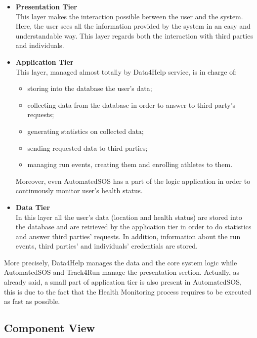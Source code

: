 \begin{itemize}
	\item \textbf{Presentation Tier} \\This layer makes the interaction possible between the user and the system. Here, the user sees all the information provided by the system in an easy and understandable way. This layer regards both the interaction with third parties and individuals. 
	\item \textbf{Application Tier} \\This layer, managed almost totally by Data4Help service, is in charge of:
	\begin{itemize}
		\item storing into the database the user's data;
		\item collecting data from the database in order to answer to third party's requests;
		\item generating statistics on collected data;
		\item sending requested data to third parties;
		\item managing run events, creating them and enrolling athletes to them.
	\end{itemize}
	Moreover, even AutomatedSOS has a part of the logic application in order to continuously monitor user's health status.
	\item \textbf{Data Tier} \\In this layer all the user's data (location and health status) are stored into the database and are retrieved by the application tier in order to do statistics and answer third parties' requests. In addition, information about the run events, third parties' and individuals' credentials are stored.
\end{itemize}
\bigbreak
\noindent
More precisely, Data4Help manages the data and the core system logic while AutomatedSOS and Track4Run manage the presentation section. Actually, as already said, a small part of application tier is also present in AutomatedSOS, this is due to the fact that the Health Monitoring process requires to be executed as fast as possible. 
\subsection{Component View}

